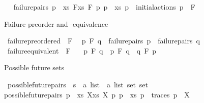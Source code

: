 \begin{isabellebody}
\ \ \isanewline
{\isacartoucheopen}failure{\isacharunderscore}{\kern0pt}pairs\ p\ {\isasymequiv}\ {\isacharbraceleft}{\kern0pt}{\isacharparenleft}{\kern0pt}xs{\isacharcomma}{\kern0pt}\ F{\isacharparenright}{\kern0pt}{\isacharbar}{\kern0pt}xs\ F{\isachardot}{\kern0pt}\ {\isasymexists}p{\isacharprime}{\kern0pt}{\isachardot}{\kern0pt}\ p\ {\isasymmapsto}{\isachardollar}{\kern0pt}\ xs\ p{\isacharprime}{\kern0pt}\ {\isasymand}\ {\isacharparenleft}{\kern0pt}initial{\isacharunderscore}{\kern0pt}actions\ p{\isacharprime}{\kern0pt}\ {\isasyminter}\ F\ {\isacharequal}{\kern0pt}\ {\isacharbraceleft}{\kern0pt}{\isacharbraceright}{\kern0pt}{\isacharparenright}{\kern0pt}{\isacharbraceright}{\kern0pt}{\isacartoucheclose}%
\begin{isamarkuptext}%
Failure preorder and -equivalence%
\end{isamarkuptext}\isamarkuptrue%
\isamarkupfalse%
\ failure{\isacharunderscore}{\kern0pt}preordered\ {\isacharparenleft}{\kern0pt}\ {\isacartoucheopen}{\isasymlesssim}F{\isacartoucheclose}\ {}{}{\isacharparenright}{\kern0pt}\ \isanewline
{\isacartoucheopen}p\ {\isasymlesssim}F\ q\ {\isasymequiv}\ failure{\isacharunderscore}{\kern0pt}pairs\ p\ {\isasymsubseteq}\ failure{\isacharunderscore}{\kern0pt}pairs\ q{\isacartoucheclose}\isanewline
\isanewline
{}\isamarkupfalse%
\ failure{\isacharunderscore}{\kern0pt}equivalent\ {\isacharparenleft}{\kern0pt}\ {\isacartoucheopen}{\isasymsimeq}F{\isacartoucheclose}\ {}{}{\isacharparenright}{\kern0pt}\ \isanewline
{\isacartoucheopen}\ p\ {\isasymsimeq}F\ q\ {\isasymequiv}\ p\ {\isasymlesssim}F\ q\ {\isasymand}\ q\ {\isasymlesssim}F\ p{\isacartoucheclose}%
\begin{isamarkuptext}%
Possible future sets%
\end{isamarkuptext}\isamarkuptrue%
\isamarkupfalse%
\ possible{\isacharunderscore}{\kern0pt}future{\isacharunderscore}{\kern0pt}pairs\ {\isacharcolon}{\kern0pt}{\isacharcolon}{\kern0pt}\ {\isacartoucheopen}{\isacharprime}{\kern0pt}s\ {\isasymRightarrow}\ {\isacharparenleft}{\kern0pt}{\isacharprime}{\kern0pt}a\ list\ {\isasymtimes}\ {\isacharprime}{\kern0pt}a\ list\ set{\isacharparenright}{\kern0pt}\ set{\isacartoucheclose}\isanewline
\ \ \isanewline
{\isacartoucheopen}possible{\isacharunderscore}{\kern0pt}future{\isacharunderscore}{\kern0pt}pairs\ p\ {\isasymequiv}\ {\isacharbraceleft}{\kern0pt}{\isacharparenleft}{\kern0pt}xs{\isacharcomma}{\kern0pt}\ X{\isacharparenright}{\kern0pt}{\isacharbar}{\kern0pt}xs\ X{\isachardot}{\kern0pt}\ {\isasymexists}p{\isacharprime}{\kern0pt}{\isachardot}{\kern0pt}\ p\ {\isasymmapsto}{\isachardollar}{\kern0pt}\ xs\ p{\isacharprime}{\kern0pt}\ {\isasymand}\ traces\ p{\isacharprime}{\kern0pt}\ {\isacharequal}{\kern0pt}\ X{\isacharbraceright}{\kern0pt}{\isacartoucheclose}\isanewline

\end{isabellebody}
